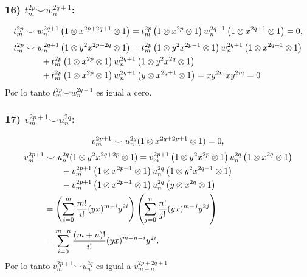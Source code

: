 \documentclass[fleqn,../tesis.tex]{subfiles}
\begin{document}
\subsubsection{16) $t_m^{2p} \smile w_n^{2q + 1}$:}
\begin{align*}
	t_m^{2p}\smile w_n^{2q + 1}\left(1\otimes x^{2p + 2q + 1} \otimes 1\right)
		= t_m^{2p}\left(1\otimes x^{2p}\otimes 1\right)w_n^{2q + 1}\left(1\otimes x^{2q + 1}\otimes 1\right) = 0,
\end{align*}
\begin{align*}
	t_m^{2p} & \smile w_n^{2q + 1}\left(1\otimes y^2x^{2p + 2q} \otimes 1\right)
		= t_m^{2p}\left(1\otimes y^2x^{2p - 1}\otimes 1\right)w_n^{2q + 1}\left(1\otimes x^{2q + 1}\otimes 1\right)\\
	&\qquad + t_m^{2p}\left(1 \otimes x^{2p} \otimes 1\right)w_n^{2q + 1}\left(1\otimes y^2x^{2q}\otimes 1\right)\\
	&\qquad + t_m^{2p}\left(1 \otimes x^{2p} \otimes 1\right)w_n^{2q + 1}\left(y\otimes x^{2q +1}\otimes 1\right)
	= xy^{2m}xy^{2m} = 0
\end{align*}
Por lo tanto $t_m^{2p}\smile w_n^{2q + 1}$ es igual a cero.
\subsubsection{17) $v_m^{2p + 1} \smile u_n^{2q}$:}
\begin{align*}
	v_m^{2p + 1} \smile u_n^{2q}(1 \otimes x^{2q + 2p + 1} \otimes 1) = 0,
\end{align*}
\begin{align*}
	v_m^{2p + 1} &\smile u_n^{2q}(1 \otimes y^2x^{2q + 2p} \otimes 1)
		= v_m^{2p + 1}\left(1\otimes y^2x^{2p}\otimes 1\right)u_n^{2q}\left(1\otimes x^{2q}\otimes 1\right)\\
	&\qquad - v_m^{2p + 1}\left(1 \otimes x^{2p + 1}  \otimes 1\right)u_n^{2q}\left(1\otimes y^2x^{2q - 1}\otimes 1\right)\\
	&\qquad - v_m^{2p + 1}\left(1 \otimes x^{2p + 1} \otimes 1\right)u_n^{2q}\left(y\otimes x^{2q}\otimes 1\right)\\
	&= \left(\sum_{i = 0}^{m}\frac{m!}{i!}(yx)^{m - i}y^{2i}\right)
		\left(\sum_{j = 0}^{n}\frac{n!}{j!}(yx)^{m - j}y^{2j}\right)\\
	&= \sum_{i = 0}^{m + n}\frac{(m + n)!}{i!}(yx)^{m + n - i}y^{2i}.
\end{align*}
Por lo tanto $v_m^{2p + 1} \smile u_n^{2q}$ es igual a $v_{m + n}^{2p + 2q + 1}$
\end{document}
